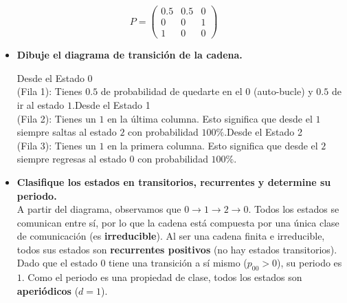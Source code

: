 \documentclass[10pt,a4paper]{book}
\begin{document}
\[ P = \begin{pmatrix} 
0.5 &  0.5 & 0 \\ 
0   &  0   & 1 \\
1   &  0   & 0
\end{pmatrix} \]

\vspace{0.2cm}

\begin{itemize}
    \item[\textbf{a)}] \textbf{Dibuje el diagrama de transición de la cadena.}
    \begin{center}
    \end{center}

    \vspace{0.2cm}

    Desde el Estado 0 \\
    (Fila 1): Tienes $0.5$ de probabilidad de quedarte en el $0$ (auto-bucle) y $0.5$ de ir al estado $1$.Desde el Estado 1 \\
    (Fila 2): Tienes un $1$ en la última columna. Esto significa que desde el $1$ siempre saltas al estado $2$ con probabilidad $100\%$.Desde el Estado 2\\
    (Fila 3): Tienes un $1$ en la primera columna. Esto significa que desde el $2$ siempre regresas al estado $0$ con probabilidad $100\%$.

    \vspace{0.2cm}
  
    \item[\textbf{b)}] \textbf{Clasifique los estados en transitorios, recurrentes y determine su periodo.} \\
    A partir del diagrama, observamos que $0 \to 1 \to 2 \to 0$. Todos los estados se comunican entre sí, por lo que la cadena está compuesta por una única clase de comunicación (es \textbf{irreducible}).
    Al ser una cadena finita e irreducible, todos sus estados son \textbf{recurrentes positivos} (no hay estados transitorios).
    Dado que el estado $0$ tiene una transición a sí mismo ($p_{00} > 0$), su periodo es $1$. Como el periodo es una propiedad de clase, todos los estados son \textbf{aperiódicos} ($d=1$).


\end{itemize}
\end{document}
